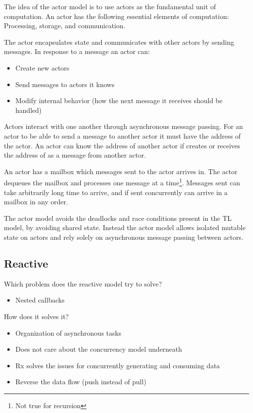 The idea of the actor model is to use actors as the fundamental unit of computation. An actor has the following essential elements of computation\cite{actorLangNextVideo}: Processing, storage, and communication.

The actor encapsulates state and communicates with other actors by sending messages. In response to a message an actor can\cite{hewitt2014actor}:
\begin{itemize}
\item Create new actors
\item Send messages to actors it knows
\item Modify internal behavior (how the next message it receives should be handled)
\end{itemize}
Actors interact with one another through asynchronous message passing. For an actor to be able to send a message to another actor it must have the address of the actor. An actor  can know the address of another actor  if  creates  or receives the address of  as a message from another actor.

An actor has a mailbox which messages sent to the actor arrives in. The actor dequeues the mailbox and processes one message at a time\footnote{Not true for recursion}. Messages sent can take arbitrarily long time to arrive, and if sent concurrently can arrive in a mailbox in any order\cite{hewitt2014actor}.

The actor model avoids the deadlocks and race conditions present in the \ac{TL} model, by avoiding shared state\citep[Chap. 32]{odersky2011programming}. Instead the actor model allows isolated mutable state on actors and rely solely on asynchronous message passing between actors.



\subsection{Reactive}

Which problem does the reactive model try to solve?
\begin{itemize}
\item Nested callbacks
\end{itemize}

How does it solves it?
\begin{itemize}
\item Organization of asynchronous tasks
\item Does not care about the concurrency model underneath
\item Rx solves the issues for concurrently generating and consuming data
\item Reverse the data flow (push instead of pull)
\end{itemize}

